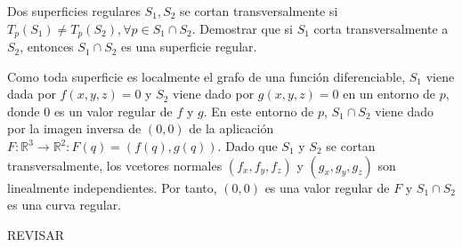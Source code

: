 
\begin{ejr}[6]
  Dos superficies regulares $S_{1}, S_{2}$ se cortan transversalmente si $T_{p}(S_{1}) \neq T_{p}(S_{2}), \forall p \in S_{1} \cap S_{2}$. Demostrar que si $S_{1}$ corta transversalmente a $S_{2}$, entonces $S_{1} \cap S_{2}$ es una superficie regular.
\end{ejr}

\begin{sol}
  Como toda superficie es localmente el grafo de una función diferenciable, $S_{1}$ viene dada por $f(x, y, z) = 0$ y $S_{2}$ viene dado por $g(x, y, z) = 0$ en un entorno de $p$, donde $0$ es un valor regular de $f$ y $g$. En este entorno de $p$, $S_{1} \cap S_{2}$ viene dado por la imagen inversa de $(0, 0)$ de la aplicación $F : \mathbb{R}^{3} \to \mathbb{R}^{2} : F(q) = (f(q), g(q))$. Dado que $S_{1}$ y $S_{2}$ se cortan transversalmente, los vcetores normales $(f_{x}, f_{y}, f_{z})$ y $(g_{x}, g_{y}, g_{z})$ son linealmente independientes. Por tanto, $(0, 0)$ es una valor regular de $F$ y $S_{1} \cap S_{2}$ es una curva regular.

  REVISAR
\end{sol}
